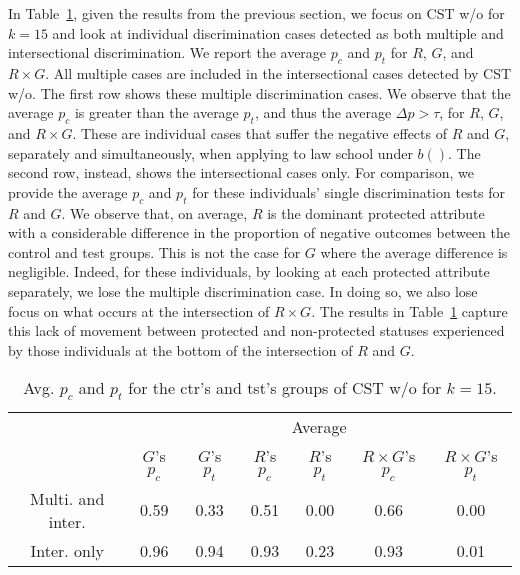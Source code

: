 In Table~\ref{table:MultivsInter}, given the results from the previous section, we focus on CST w/o for $k=15$ and look at individual discrimination cases detected as both multiple and intersectional discrimination.
We report the average $p_c$ and $p_t$ for $R$, $G$, and $R \times G$.
All multiple cases are included in the intersectional cases detected by CST w/o.
The first row shows these multiple discrimination cases. We observe that the average $p_c$ is greater than the average $p_t$, and thus the average $\Delta p > \tau$, for $R$, $G$, and $R \times G$. 
These are individual cases that suffer the negative effects of $R$ and $G$, separately and simultaneously, when applying to law school under $b()$.
The second row, instead, shows the intersectional cases only. 
For comparison, we provide the average $p_c$ and $p_t$ for these individuals' single discrimination tests for $R$ and $G$.
We observe that, on average, $R$ is the dominant protected attribute with a considerable difference in the proportion of negative outcomes between the control and test groups. 
This is not the case for $G$ where the average difference is negligible. 
Indeed, for these individuals, by looking at each protected attribute separately, we lose the multiple discrimination case.
In doing so, we also lose focus on what occurs at the intersection of $R \times G$.
The results in Table~\ref{table:MultivsInter} capture this lack of movement between protected and non-protected statuses experienced by those individuals at the bottom of the intersection of $R$ and $G$.

%
\begin{table}[t]
\caption{Avg. $p_c$ and $p_t$ for the ctr's and tst's groups of CST w/o for $k=15$.}
  \label{table:MultivsInter}
  \centering
  \begin{tabular}{ccccccc}
    \toprule
    & \multicolumn{6}{c}{Average}\\
    & $G$'s $p_c$ & $G$'s $p_t$ & $R$'s $p_c$ & $R$'s $p_t$ & $R \times G$'s $p_c$ & $R \times G$'s $p_t$\\
    \midrule
    Multi. and inter. & 0.59 & 0.33 & 0.51 & 0.00 & 0.66 & 0.00 \\
    Inter. only & 0.96 & 0.94 & 0.93 & 0.23 & 0.93 & 0.01 \\
    \bottomrule
  \end{tabular}
\end{table}
%

%
%
